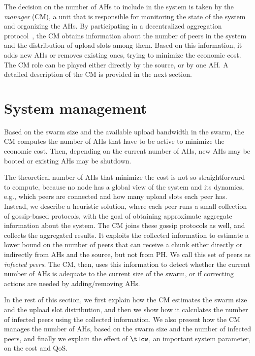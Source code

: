 The decision on the number of AHs to include in the system is taken by the
\emph{\clive manager} (CM), a unit that is responsible for monitoring the
state of the system and organizing the AHs. By participating in a
decentralized aggregation protocol~\cite{aggregation}, the CM obtains
information about the number of peers in the system and the distribution of
upload slots among them. Based on this information, it adds new AHs or removes
existing ones, trying to minimize the economic cost. The CM role can be played
either directly by the source, or by one AH. A detailed description of the CM
is provided in the next section.

\section{System management} \label{sec:cmmanager}

Based on the swarm size and the available upload bandwidth in the swarm, the CM
computes the number of AHs that have to be active to minimize the economic
cost. Then, depending on the current number of AHs, new AHs may be booted or
existing AHs may be shutdown.

The theoretical number of AHs that minimize the cost is not so straightforward
to compute, because no node has a global view of the system and its dynamics,
e.g., which peers are connected and how many upload slots each peer has.
Instead, we describe a heuristic solution, where each peer runs a small
collection of gossip-based protocols, with the goal of obtaining approximate
aggregate information about the system. The CM joins these gossip protocols as
well, and collects the aggregated results. It exploits the collected
information to estimate a lower bound on the number of peers that can receive
a chunk either directly or indirectly from AHs and the source, but not from
PH. We call this set of peers as {\em infected peers}. The CM, then, uses this
information to detect whether the current number of AHs is adequate to the
current size of the swarm, or if correcting actions are needed by
adding/removing AHs.

In the rest of this section, we first explain how the CM estimates the swarm size
and the upload slot distribution, and then we show how it calculates the
number of infected peers using the collected information. We also present how
the CM manages the number of AHs, based on the swarm size and the number of
infected peers, and finally we explain the effect of $\tlcw$, an important
system parameter, on the cost and QoS.

